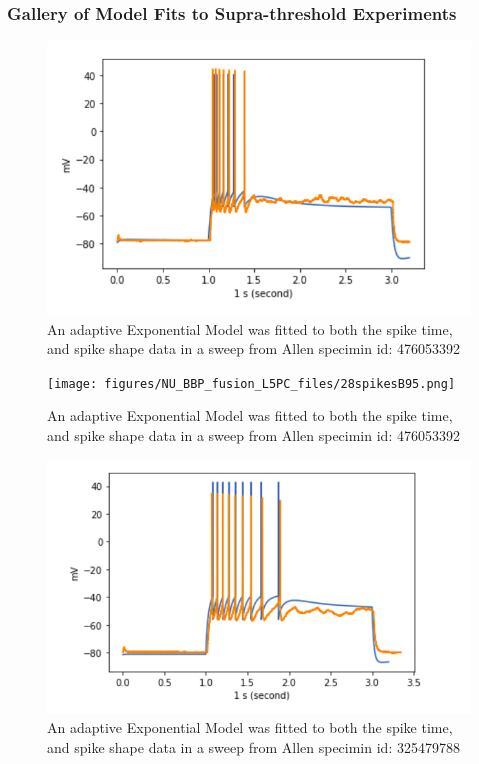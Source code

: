 \subsubsection{Gallery of Model Fits to Supra-threshold Experiments}


\begin{figure}
    \centering
    \includegraphics[scale=0.75]{figures/adexp_fit_allen_spec_id_476053392.png}
    \caption{An adaptive Exponential Model was fitted to both the spike time, and spike shape data in a sweep from Allen specimin id: 476053392} \label{fig:specimen_476053392}
\end{figure}

\begin{figure}
    \centering
    \texttt{[image: figures/NU\_BBP\_fusion\_L5PC\_files/28spikesB95.png]}
    \caption{An adaptive Exponential Model was fitted to both the spike time, and spike shape data in a sweep from Allen specimin id: 476053392} \label{fig:specimen_476053392}
\end{figure}

\begin{figure}
    \centering
    \includegraphics[scale=0.75]{figures/adexp_fit_allen_specid_325479788.png}
    \caption{ An adaptive Exponential Model was fitted to both the spike time, and spike shape data in a sweep from Allen specimin id: 325479788}
    \label{fig:specimen_325479788}
\end{figure}


